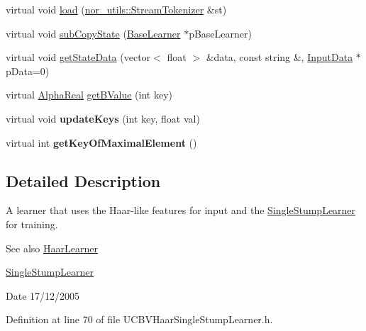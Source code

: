 \begin{DoxyCompactItemize}
\item 
virtual void \hyperlink{classMultiBoost_1_1UCBVHaarSingleStumpLearner_a57d70dfa5047ba4ff322a581a04a6345}{load} (\hyperlink{classnor__utils_1_1StreamTokenizer}{nor\_\-utils::StreamTokenizer} \&st)
\item 
virtual void \hyperlink{classMultiBoost_1_1UCBVHaarSingleStumpLearner_ac57c9a360303b9593a0367256e65fed8}{subCopyState} (\hyperlink{classMultiBoost_1_1BaseLearner}{BaseLearner} $\ast$pBaseLearner)
\item 
virtual void \hyperlink{classMultiBoost_1_1UCBVHaarSingleStumpLearner_aae9295085f9c578965b1b4d4007dbd59}{getStateData} (vector$<$ float $>$ \&data, const string \&, \hyperlink{classMultiBoost_1_1InputData}{InputData} $\ast$pData=0)
\item 
virtual \hyperlink{Defaults_8h_a80184c4fd10ab70a1a17c5f97dcd1563}{AlphaReal} \hyperlink{classMultiBoost_1_1UCBVHaarSingleStumpLearner_a48face63385bb66820d3acfe99a67a78}{getBValue} (int key)
\item 
\hypertarget{classMultiBoost_1_1UCBVHaarSingleStumpLearner_ab540037194d29d39ae908a0298e374cc}{
virtual void {\bfseries updateKeys} (int key, float val)}
\label{classMultiBoost_1_1UCBVHaarSingleStumpLearner_ab540037194d29d39ae908a0298e374cc}

\item 
\hypertarget{classMultiBoost_1_1UCBVHaarSingleStumpLearner_a34a81f4aaed8e5422b3808999b73fa5f}{
virtual int {\bfseries getKeyOfMaximalElement} ()}
\label{classMultiBoost_1_1UCBVHaarSingleStumpLearner_a34a81f4aaed8e5422b3808999b73fa5f}

\end{DoxyCompactItemize}


\subsection{Detailed Description}
A learner that uses the Haar-\/like features for input and the \hyperlink{classMultiBoost_1_1SingleStumpLearner}{SingleStumpLearner} for training. \begin{DoxySeeAlso}{See also}
\hyperlink{classMultiBoost_1_1HaarLearner}{HaarLearner} 

\hyperlink{classMultiBoost_1_1SingleStumpLearner}{SingleStumpLearner} 
\end{DoxySeeAlso}
\begin{DoxyDate}{Date}
17/12/2005 
\end{DoxyDate}


Definition at line 70 of file UCBVHaarSingleStumpLearner.h.



